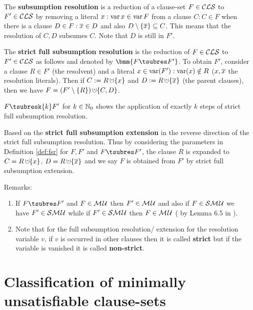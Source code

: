 \documentclass{report}
\begin{document}
\begin{defi}\label{def:sres}
The \textbf{subsumption resolution} is a reduction of a clause-set $F \in \mathcal{CLS}$ to $F' \in \mathcal{CLS}$ by removing a literal $x : \operatorname{var}{x} \in \operatorname{var}{F}$ from a clause $C:C \in F$ when there is a clause $D \in F: \overline x \in D$ and also $D \setminus \{ \overline x \} \subseteq C$. This means that the resolution of $C,D$ subsumes $C$. Note that $D$ is still in $F'$.
\end{defi}

\begin{defi}\label{def:fsr}
\cite{KullmannZhao2010Extremal} The \textbf{strict full subsumption resolution} is the reduction of $F \in \mathcal{CLS}$ to $F'\in \mathcal{CLS}$ as follows and denoted by $\bmm{F \tsubres F'}$. To obtain $F'$, consider a clause $R \in F'$ (the resolvent) and a literal $x \in \operatorname{var}(F'):\operatorname{var}(x) \notin R$ ($x, \overline{x}$ the resolution literals). Then if $C := R \addcup \set{x}$ and $D := R \addcup \set{\ol{x}}$ (the parent clauses), then we have $F = (F' \sm \set{R}) \addcup \set{C,D}$.

$F \tsubresk{k} F'$ for $k \in \mathbb{N}_0$ shows the application of exactly $k$ steps of strict full subsumption resolution. 
\end{defi}
   
\begin{defi}\label{def:fse}
Based on \cite{KullmannZhao2010Extremal} the \textbf{strict full subsumption extension} in the reverse direction of the strict full subsumption resolution. Thus by considering the parameters in Definition \ref{def:fsr} for $F, F'$ and $F \tsubres F'$, the clause $R$ is expanded to $C = R \addcup \set{x}$, $D = R \addcup \set{\ol{x}}$ and we say $F$ is obtained from $F'$ by strict full subsumption extension.
\end{defi}
Remarks:
  \begin{enumerate}
  \item If  $F \tsubres F'$ and $F \in \mathcal{M\hspace{0.8pt}U} $ then $ F' \in \mathcal{M\hspace{0.8pt}U}$ and also if $F \in \mathcal{S}\mathcal{M\hspace{0.8pt}U}$ we have $ F' \in \mathcal{S}\mathcal{M\hspace{0.8pt}U}$ while if $ F' \in \mathcal{S}\mathcal{M\hspace{0.8pt}U}$ then $F \in \mathcal{M\hspace{0.8pt}U} $ ( by Lemma 6.5 in \cite{KullmannZhao2010Extremal}). 
  \item Note that for the full subsumption resolution/ extension for the resolution variable $v$, if $v$ is occurred in other clauses then it is called \textbf{strict} but if the variable is vanished it is called \textbf{non-strict}.
  \end{enumerate}
\section{Classification of minimally unsatisfiable clause-sets}
\label{sec:c-mucls}
\end{document}
